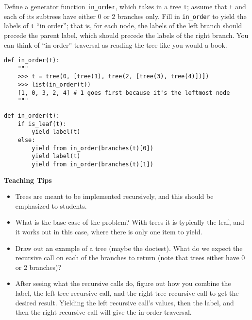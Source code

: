\begin{blocksection}
\question
Define a generator function \lstinline{in_order}, which takes in a tree \lstinline{t}; assume that \lstinline{t} and each of its subtrees have either 0 or 2 branches only. Fill in \lstinline{in_order} to yield the labels of \lstinline{t} ``in order''; that is, for each node, the labels of the left branch should precede the parent label, which should precede the labels of the right branch. You can think of ``in order'' traversal as reading the tree like you would a book. 

\begin{lstlisting}
def in_order(t):
    """
    >>> t = tree(0, [tree(1), tree(2, [tree(3), tree(4)])])
    >>> list(in_order(t))
    [1, 0, 3, 2, 4] # 1 goes first because it's the leftmost node
    """
\end{lstlisting}

\begin{solution}[3 in.]
\begin{lstlisting}
def in_order(t):
    if is_leaf(t):
        yield label(t)
    else:
        yield from in_order(branches(t)[0])
        yield label(t)
        yield from in_order(branches(t)[1])
\end{lstlisting}
\end{solution}
\end{blocksection}

\begin{guide}
\begin{blocksection}
\textbf{Teaching Tips}
    \begin{itemize}
    \item Trees are meant to be implemented recursively, and this should be emphasized to students.
    \item What is the base case of the problem? With trees it is typically the leaf, and it works out in this case, where there is only one item to yield.
    \item Draw out an example of a tree (maybe the doctest). What do we expect the recursive call on each of the branches to return (note that trees either have 0 or 2 branches)?
    \item After seeing what the recursive calls do, figure out how you combine the label, the left tree recursive call, and the right tree recursive call to get the desired result. Yielding the left recursive call's values, then the label, and then the right recursive call will give the in-order traversal.
    \end{itemize}
\end{blocksection}
\end{guide}